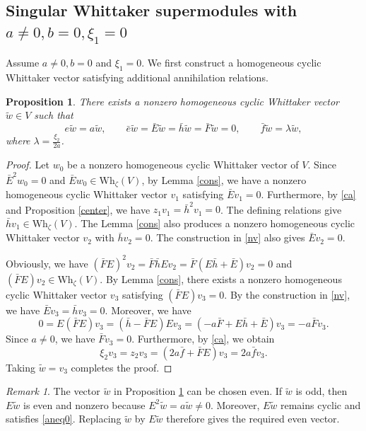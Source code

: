 \documentclass[a4paper,10pt]{article}
\theoremstyle{definition}
\theoremstyle{plain}
\newtheorem{proposition}[definition]{Proposition}
\theoremstyle{remark}
\newtheorem{remark}[definition]{Remark}
\theoremstyle{mystyle}
\numberwithin{equation}{section}
\begin{document}
\subsection{Singular Whittaker supermodules with $a\neq0,b=0,\xi_1=0$}\label{s31}
Assume $a\neq 0,b=0$ and $\xi_1=0$. We first construct a homogeneous cyclic Whittaker vector satisfying additional annihilation relations.
\begin{proposition}\label{xi0}
    There exists a nonzero homogeneous cyclic Whittaker vector $\widetilde w\in V$ such that
    \begin{equation}\label{aneq0}
        e\widetilde w=a\widetilde w,\qquad \bar e\widetilde w=\bar E\widetilde w=\bar h\widetilde w=\bar F\widetilde w=0,\qquad \bar f\widetilde w=\lambda \widetilde w,
    \end{equation}
    where $\lambda=\frac{\xi_2}{2a}$.
\end{proposition}
\begin{proof}
    Let $w_0$ be a nonzero homogeneous cyclic Whittaker vector of $V$. Since $\bar E^2w_0=0$ and $\bar Ew_0\in \mathrm{Wh}_{\zeta}(V)$, by Lemma \ref{cons}, we have a nonzero homogeneous cyclic Whittaker vector $v_1$ satisfying $\bar Ev_1=0$. Furthermore, by \eqref{ca} and Proposition \ref{center}, we have $z_1v_1=\bar h^2v_1=0$. The defining relations give $\bar hv_1\in \mathrm{Wh}_{\zeta}(V)$. The Lemma \ref{cons} also produces a nonzero homogeneous cyclic Whittaker vector $v_2$ with $\bar hv_2=0$. The construction in \eqref{nv} also gives $\bar Ev_2=0$. 

    Obviously, we have $(\bar FE)^2v_2=\bar F\bar hEv_2=\bar F(E\bar h+\bar E)v_2=0$ and $(\bar FE)v_2\in \mathrm{Wh}_{\zeta}(V)$. By Lemma \ref{cons}, there exists a nonzero homogeneous cyclic Whittaker vector $v_3$ satisfying $(\bar FE)v_3=0$. By the construction in \eqref{nv}, we have $\bar Ev_3=\bar hv_3=0$. Moreover, we have 
    $$
    0=E(\bar FE)v_3=(\bar h-\bar FE)Ev_3=(-a\bar F+E\bar h+\bar E)v_3=-a\bar Fv_3.
    $$
    Since $a\neq 0$, we have $\bar Fv_3=0$. Furthermore, by \eqref{ca}, we obtain
    $$
    \xi_2v_3=z_2v_3=(2a\bar f+\bar FE)v_3=2a\bar fv_3.
    $$
    Taking $\widetilde w=v_3$ completes the proof.
\end{proof}
\begin{remark}\label{toeven}
    The vector \(\widetilde w\) in Proposition \ref{xi0} can be chosen even. If $\widetilde w$ is odd, then $E\widetilde w$ is even and nonzero because $E^2\widetilde w=a\widetilde w\ne0$. Moreover, \(E\widetilde w\) remains cyclic and satisfies \eqref{aneq0}. Replacing \(\widetilde w\) by \(E\widetilde w\) therefore gives the required even vector.
\end{remark}
\end{document}

